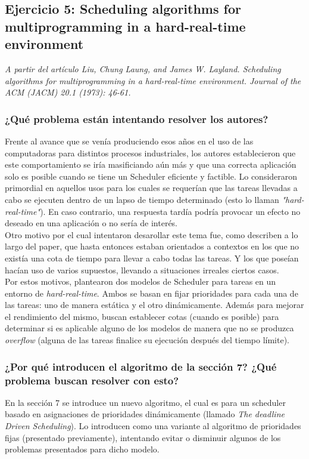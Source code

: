 \documentclass[a4paper]{article}
\begin{document}
\newpage

 \subsection{Ejercicio 5: Scheduling algorithms for multiprogramming in a hard-real-time environment}
 
\textit{A partir del art\'iculo Liu, Chung Laung, and James W. Layland. Scheduling algorithms for multiprogramming in a hard-real-time environment. Journal of the ACM (JACM) 20.1 (1973): 46-61.}


\subsubsection{¿Qu\'e problema est\'an intentando resolver los autores?}

Frente al avance que se ven\'ia produciendo esos años en el uso de las computadoras para distintos procesos industriales, los autores establecieron que este comportamiento se iría masificiando aún más y que una correcta aplicación solo es posible cuando se tiene un Scheduler eficiente y factible. Lo consideraron primordial en aquellos usos para los cuales se requerían que las tareas llevadas a cabo se ejecuten dentro de un lapso de tiempo determinado (esto lo llaman \textit{"hard-real-time"}). En caso contrario, una respuesta tardía podría provocar un efecto no deseado en una aplicación o no sería de interés. \\

Otro motivo por el cual intentaron desarollar este tema fue, como describen a lo largo del paper, que hasta entonces estaban orientados a contextos en los que no exist\'ia una cota de tiempo para llevar a cabo todas las tareas. Y los que pose\'ian hacían uso de varios supuestos, llevando a situaciones irreales ciertos casos. \\

Por estos motivos, plantearon dos modelos de Scheduler para tareas en un entorno de \textit{hard-real-time}. Ambos se basan en fijar prioridades para cada una de las tareas: uno de manera estática y el otro dinámicamente. Además para mejorar el rendimiento del mismo, buscan establecer cotas (cuando es posible) para determinar si es aplicable alguno de los modelos de manera que no se produzca \textit{overflow} (alguna de las tareas finalice su ejecución después del tiempo límite).


\subsubsection{¿Por qu\'e introducen el algoritmo de la secci\'on 7? ¿Qu\'e problema buscan resolver con esto?}
En la sección 7 se introduce un nuevo algoritmo, el cual es para un scheduler basado en asignaciones de prioridades dinámicamente (llamado \textit{The deadline Driven Scheduling}). Lo introducen como una variante al algoritmo de prioridades fijas (presentado previamente), intentando evitar o disminuir algunos de los problemas presentados para dicho modelo. \\
\end{document}
